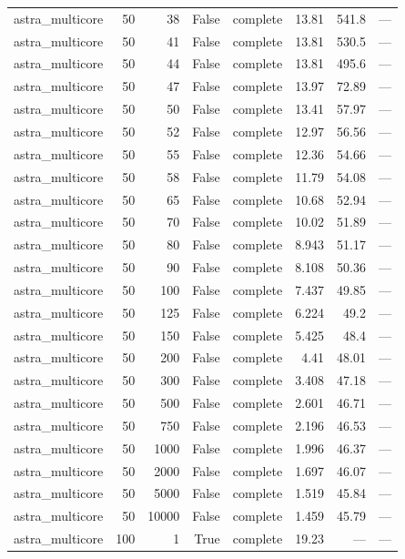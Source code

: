 \begin{tabular}{lrrrlrrl}
astra\_multicore & 50 & 38 & False & complete & 13.81 & 541.8 & — \\
astra\_multicore & 50 & 41 & False & complete & 13.81 & 530.5 & — \\
astra\_multicore & 50 & 44 & False & complete & 13.81 & 495.6 & — \\
astra\_multicore & 50 & 47 & False & complete & 13.97 & 72.89 & — \\
astra\_multicore & 50 & 50 & False & complete & 13.41 & 57.97 & — \\
astra\_multicore & 50 & 52 & False & complete & 12.97 & 56.56 & — \\
astra\_multicore & 50 & 55 & False & complete & 12.36 & 54.66 & — \\
astra\_multicore & 50 & 58 & False & complete & 11.79 & 54.08 & — \\
astra\_multicore & 50 & 65 & False & complete & 10.68 & 52.94 & — \\
astra\_multicore & 50 & 70 & False & complete & 10.02 & 51.89 & — \\
astra\_multicore & 50 & 80 & False & complete & 8.943 & 51.17 & — \\
astra\_multicore & 50 & 90 & False & complete & 8.108 & 50.36 & — \\
astra\_multicore & 50 & 100 & False & complete & 7.437 & 49.85 & — \\
astra\_multicore & 50 & 125 & False & complete & 6.224 & 49.2 & — \\
astra\_multicore & 50 & 150 & False & complete & 5.425 & 48.4 & — \\
astra\_multicore & 50 & 200 & False & complete & 4.41 & 48.01 & — \\
astra\_multicore & 50 & 300 & False & complete & 3.408 & 47.18 & — \\
astra\_multicore & 50 & 500 & False & complete & 2.601 & 46.71 & — \\
astra\_multicore & 50 & 750 & False & complete & 2.196 & 46.53 & — \\
astra\_multicore & 50 & 1000 & False & complete & 1.996 & 46.37 & — \\
astra\_multicore & 50 & 2000 & False & complete & 1.697 & 46.07 & — \\
astra\_multicore & 50 & 5000 & False & complete & 1.519 & 45.84 & — \\
astra\_multicore & 50 & 10000 & False & complete & 1.459 & 45.79 & — \\
astra\_multicore & 100 & 1 & True & complete & 19.23 & — & — \\

\end{tabular}
